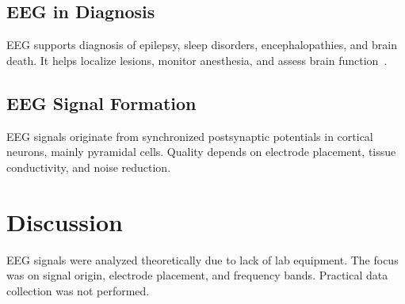 \documentclass[11pt]{article}
\begin{document}
\subsection*{EEG in Diagnosis}
EEG supports diagnosis of epilepsy, sleep disorders, encephalopathies, and brain death. It helps localize lesions, monitor anesthesia, and assess brain function~\cite{siuly2016eeg}.

\subsection*{EEG Signal Formation}
EEG signals originate from synchronized postsynaptic potentials in cortical neurons, mainly pyramidal cells. Quality depends on electrode placement, tissue conductivity, and noise reduction.

\section*{Discussion}
EEG signals were analyzed theoretically due to lack of lab equipment. The focus was on signal origin, electrode placement, and frequency bands. Practical data collection was not performed.


\renewcommand{\bibname}{References}

\end{document}
